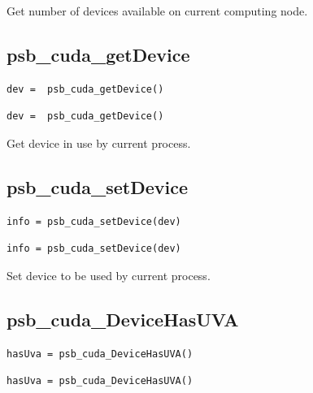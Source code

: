 Get number of devices available on current computing node. 

\subsection*{psb\_cuda\_getDevice }

\ifpdf
\begin{verbatim}
dev =  psb_cuda_getDevice()
\end{verbatim}
\else
\begin{center}
    \begin{minipage}[tl]{0.9\textwidth}
\begin{verbatim} 
dev =  psb_cuda_getDevice()
\end{verbatim}
    \end{minipage}
  \end{center}
\fi

Get  device in use by current process. 

\subsection*{psb\_cuda\_setDevice }

\ifpdf
\begin{verbatim}
info = psb_cuda_setDevice(dev)
\end{verbatim}
\else
\begin{center}
    \begin{minipage}[tl]{0.9\textwidth}
\begin{verbatim} 
info = psb_cuda_setDevice(dev)
\end{verbatim}
    \end{minipage}
  \end{center}
\fi

Set  device to be used  by current process. 

\subsection*{psb\_cuda\_DeviceHasUVA }

\ifpdf
\begin{verbatim}
hasUva = psb_cuda_DeviceHasUVA()
\end{verbatim}
\else
\begin{center}
    \begin{minipage}[tl]{0.9\textwidth}
\begin{verbatim} 
hasUva = psb_cuda_DeviceHasUVA()
\end{verbatim}
    \end{minipage}
  \end{center}
\fi

